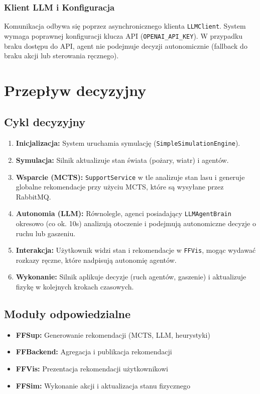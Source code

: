 \subsubsection{Klient LLM i Konfiguracja}

Komunikacja odbywa się poprzez asynchronicznego klienta \texttt{LLMClient}. System wymaga poprawnej konfiguracji klucza API (\texttt{OPENAI\_API\_KEY}). W przypadku braku dostępu do API, agent nie podejmuje decyzji autonomicznie (fallback do braku akcji lub sterowania ręcznego).


\section{Przepływ decyzyjny}

\subsection{Cykl decyzyjny}

\begin{enumerate}
    \item \textbf{Inicjalizacja:} System uruchamia symulację (\texttt{SimpleSimulationEngine}).
    \item \textbf{Symulacja:} Silnik aktualizuje stan świata (pożary, wiatr) i agentów.
    \item \textbf{Wsparcie (MCTS):} \texttt{SupportService} w tle analizuje stan lasu i generuje globalne rekomendacje przy użyciu MCTS, które są wysyłane przez RabbitMQ.
    \item \textbf{Autonomia (LLM):} Równolegle, agenci posiadający \texttt{LLMAgentBrain} okresowo (co ok. 10s) analizują otoczenie i podejmują autonomiczne decyzje o ruchu lub gaszeniu.
    \item \textbf{Interakcja:} Użytkownik widzi stan i rekomendacje w \texttt{FFVis}, mogąc wydawać rozkazy ręczne, które nadpisują autonomię agentów.
    \item \textbf{Wykonanie:} Silnik aplikuje decyzje (ruch agentów, gaszenie) i aktualizuje fizykę w kolejnych krokach czasowych.
\end{enumerate}

\subsection{Moduły odpowiedzialne}

\begin{itemize}
    \item \textbf{FFSup:} Generowanie rekomendacji (MCTS, LLM, heurystyki)
    \item \textbf{FFBackend:} Agregacja i publikacja rekomendacji
    \item \textbf{FFVis:} Prezentacja rekomendacji użytkownikowi
    \item \textbf{FFSim:} Wykonanie akcji i aktualizacja stanu fizycznego
\end{itemize}

